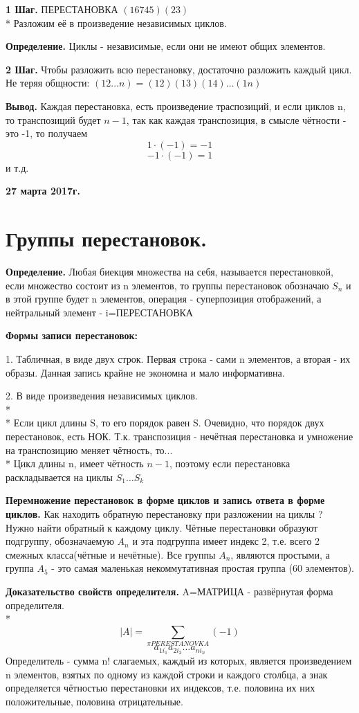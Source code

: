 \documentclass{article}
\begin{document}
{\bf 1 Шаг.} ПЕРЕСТАНОВКА $(16745)(23)$\\*
Разложим её в произведение независимых циклов.

{\bf Определение.} Циклы - независимые, если они не имеют общих элементов.

{\bf 2 Шаг.} Чтобы разложить всю перестановку, достаточно разложить каждый цикл. Не теряя общности: $(12\ldots n)=(12)(13)(14)\ldots(1n)$

{\bf Вывод.} Каждая перестановка, есть произведение траспозиций, и если циклов n, то транспозиций будет $n-1$, так как каждая транспозиция, в смысле чётности - это -1, то получаем $$1\cdot (-1)=-1$$ $$-1\cdot(-1)=1$$ и т.д.

\textbf {27 марта 2017г.}
\section*{Группы перестановок.}
{\bf Определение.} Любая биекция множества на себя, называется перестановкой, если множество состоит из n элементов, то группы перестановок обозначаю $S_n$ и в этой группе будет n элементов, операция - суперпозиция отображений, а нейтральный элемент - i=ПЕРЕСТАНОВКА

{\bf Формы записи перестановок:}

1. Табличная, в виде двух строк. Первая строка - сами n элементов, а вторая - их образы. Данная запись крайне не экономна и мало информативна.

2. В виде произведения независимых циклов.\\*
\\*
Если цикл длины S, то его порядок равен S. Очевидно, что порядок двух перестановок, есть НОК. Т.к. транспозиция - нечётная перестановка и умножение на транспозицию меняет чётность, то...\\*
Цикл длины n, имеет чётность $n-1$, поэтому если перестановка раскладывается на циклы $S_1\ldots S_k$

{\bf Перемножение перестановок в форме циклов и запись ответа в форме циклов.} Как находить обратную перестановку при разложении на циклы ? Нужно найти обратный к каждому циклу. Чётные перестановки образуют подгруппу, обозначаемую $A_n$ и эта подгруппа имеет индекс 2, т.е. всего 2 смежных класса(чётные и нечётные). Все группы $A_n$, являются простыми, а группа $A_5$ - это самая маленькая некоммутативная простая группа (60 элементов).

{\bf Доказательство свойств определителя.}
A=МАТРИЦА - развёрнутая форма определителя.\\*
$$|A|=\sum_{\pi PERESTANOVKA} (-1)$$
$$a_{1i_1}a_{2i_2}\ldots a_{ni_n}$$
Определитель - сумма n! слагаемых, каждый из которых, является произведением n элементов, взятых по одному из каждой строки и каждого столбца, а знак определяется чётностью перестановки их индексов, т.е. половина их них положительные, половина отрицательные.
\end{document}

